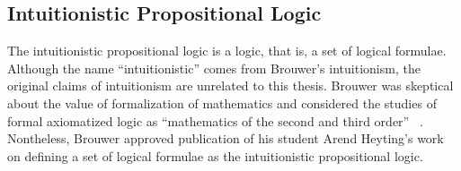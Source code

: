 \subsection{Intuitionistic Propositional Logic}

The intuitionistic propositional logic is a logic, that is, a set of
logical formulae.
Although the name ``intuitionistic'' comes from Brouwer's intuitionism,
the original claims of intuitionism are unrelated to this thesis.
Brouwer was skeptical about the value of formalization of
mathematics and considered the studies of formal axiomatized logic as
``mathematics of the second and third order''
~\citep[p.~10]{stigt1998}.
Nontheless, Brouwer approved publication of his student Arend Heyting's
work on defining a set of logical formulae as the intuitionistic
propositional logic.

